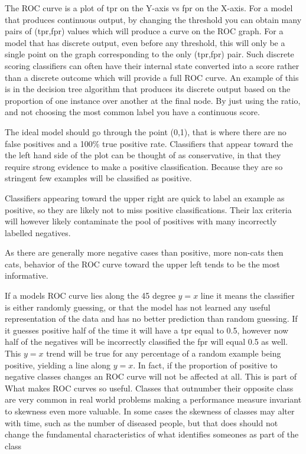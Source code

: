 The ROC curve is a plot of tpr on the Y-axis vs fpr on the X-axis.
For a model that produces continuous output, by changing the threshold you can obtain many pairs of (tpr,fpr) values which will produce a curve on the ROC graph.
For a model that has discrete output, even before any threshold, this will only be a single point on the graph corresponding to the only (tpr,fpr) pair.
Such discrete scoring classifiers can often have their internal state converted into a score rather than a discrete outcome which will provide a full ROC curve.
An example of this is in the decision tree algorithm that produces its discrete output based on the proportion of one instance over another at the final node.
By just using the ratio, and not choosing the most common label you have a continuous score.

The ideal model should go through the point (0,1), that is where there are no false positives and a 100\% true positive rate.
Classifiers that appear toward the the left hand side of the plot can be thought of as conservative, in that they require strong evidence to make a positive classification. 
Because they are so stringent few examples will be classified as positive.

Classifiers appearing toward the upper right are quick to label an example as positive, so they are likely not to miss positive classifications.
Their lax criteria will however likely contaminate the pool of positives with many incorrectly labelled negatives.

As there are generally more negative cases than positive, more non-cats then cats, behavior of the ROC curve toward the upper left tends to be the most informative.

If a models ROC curve lies along the 45 degree $y=x$ line it means the classifier is either randomly guessing, or that the model has not learned any useful representation of the data and has no better prediction than random guessing.
If it guesses positive half of the time it will have a tpr equal to 0.5, however now half of the negatives will be incorrectly classified the fpr will equal 0.5 as well.
This $y=x$ trend will be true for any percentage of a random example being positive, yielding a line along $y=x$.
In fact, if the proportion of positive to negative classes changes an ROC curve will not be affected at all.
This is part of What makes ROC curves so useful.
Classes that outnumber their opposite class are very common in real world problems making a performance measure invariant to skewness even more valuable.
In some cases the skewness of classes may alter with time, such as the number of diseased people, but that does should not change the fundamental characteristics of what identifies someones as part of the class

